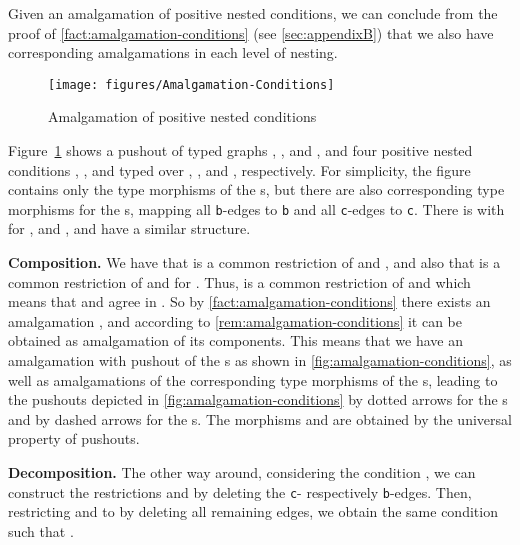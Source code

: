 \begin{remark}\label{rem:amalgamation-conditions}
	Given an amalgamation  of positive nested conditions, we can conclude from the proof of \autoref{fact:amalgamation-conditions} (see \autoref{sec:appendixB}) that we also have corresponding amalgamations in each
	level of nesting.
\end{remark}

\begin{figure}[htb]\centering
\texttt{[image: figures/Amalgamation-Conditions]}
\caption{Amalgamation of positive nested conditions}\label{fig:amalgamation-conditions}
\end{figure}


\begin{example}\label{ex:amalgamation-conditions}
	Figure~\ref{fig:amalgamation-conditions} shows a pushout of typed graphs , ,  and , and four positive nested conditions
	, ,  and  typed over , ,  and , respectively. For simplicity, the figure
	contains only the type morphisms of the s, but there are also corresponding type morphisms for the s, mapping all \texttt{b}-edges to
	\texttt{b} and all \texttt{c}-edges to \texttt{c}. 
	There is  with  for , and ,
	 and  have a similar structure.
	\begin{description}
		\item \textbf{Composition.}
			We have that  is a common restriction of  and , and also that  is a common
			restriction of  and  for . Thus,  is a common restriction of  and 
			which means that  and  agree in . So by \autoref{fact:amalgamation-conditions} there
			exists an amalgamation , and according to \autoref{rem:amalgamation-conditions}
			it can be obtained as amalgamation of its components. This means that we have an amalgamation 
			 with pushout of the s as shown in \autoref{fig:amalgamation-conditions},
			as well as amalgamations of the corresponding type morphisms of the s, leading to the
			pushouts depicted in \autoref{fig:amalgamation-conditions} by dotted arrows for the s and by dashed arrows for the s.
			The morphisms  and  are obtained by the universal property of pushouts.
		\item \textbf{Decomposition.}
			The other way around, considering the condition , we can construct the restrictions  and  by deleting
			the \texttt{c}- respectively \texttt{b}-edges. Then, restricting  and  to  by deleting all remaining edges,
			we obtain the same condition  such that .
	\end{description}
\end{example}


